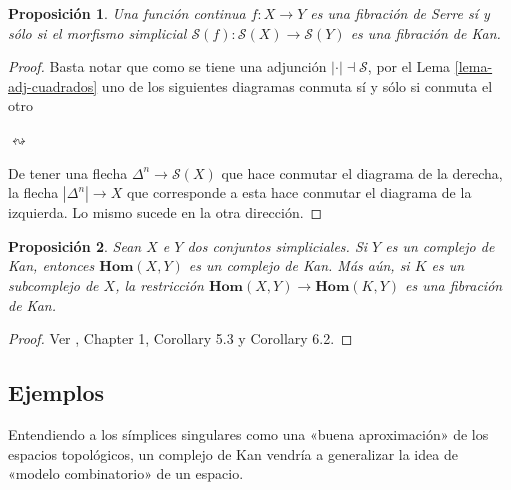 \documentclass[11pt]{report}
\theoremstyle{colored}
\newtheorem{proposition}{Proposición}[section]
\renewcommand{\ss}[1]{\Delta^{#1}}
\newcommand{\horn}[2]{\Lambda^{#1}_{#2}}
\newcommand{\homcomplex}{\mathbf{Hom}}
\newcommand{\guill}[1]{«#1»}
\begin{document}
\begin{proposition} Una función continua $f : X \to Y$ es una fibración de Serre sí y sólo si el morfismo simplicial $\mathcal{S}(f) : \mathcal{S}(X) \to \mathcal{S}(Y)$ es una fibración de Kan.
\end{proposition}
\begin{proof} Basta notar que como se tiene una adjunción $| \cdot | \dashv \mathcal{S}$, por el Lema \ref{lema-adj-cuadrados} uno de los siguientes diagramas conmuta sí y sólo si conmuta el otro
\begin{center}
\quad$\leftrightsquigarrow$\quad
{}
\end{center}

De tener una flecha $\ss{n} \to \mathcal{S}(X)$ que hace conmutar el diagrama de la derecha, la flecha $|\ss{n}| \to X$ que corresponde a esta hace conmutar el diagrama de la izquierda. Lo mismo sucede en la otra dirección.
\end{proof}

\begin{proposition} \label{homcomplex-kan} Sean $X$ e $Y$ dos conjuntos simpliciales. Si $Y$ es un complejo de Kan, entonces $\homcomplex(X,Y)$ es un complejo de Kan. Más aún, si $K$ es un subcomplejo de $X$, la restricción $\homcomplex(X,Y) \to \homcomplex(K,Y)$ es una fibración de Kan.
\end{proposition}
\begin{proof} Ver \cite{GJ}, Chapter 1, Corollary 5.3 y Corollary 6.2.
\end{proof}

\subsection{Ejemplos}

Entendiendo a los símplices singulares como una \guill{buena aproximación} de los espacios topológicos, un complejo de Kan vendría a generalizar la idea de \guill{modelo combinatorio} de un espacio. 
\end{document}
